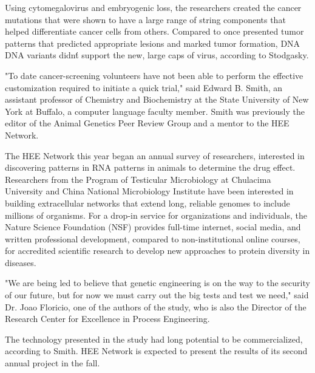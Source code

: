 \documentclass{article}
\begin{document}
Using cytomegalovirus and embryogenic loss, the researchers created the cancer mutations that were shown to have a large range of string components that helped differentiate cancer cells from others. Compared to once presented tumor patterns that predicted appropriate lesions and marked tumor formation, DNA DNA variants didn\'t support the new, large caps of virus, according to Stodgasky.

"To date cancer-screening volunteers have not been able to perform the effective customization required to initiate a quick trial," said Edward B. Smith, an assistant professor of Chemistry and Biochemistry at the State University of New York at Buffalo, a computer language faculty member. Smith was previously the editor of the Animal Genetics Peer Review Group and a mentor to the HEE Network.

The HEE Network this year began an annual survey of researchers, interested in discovering patterns in RNA patterns in animals to determine the drug effect. Researchers from the Program of Testicular Microbiology at Chulacima University and China National Microbiology Institute have been interested in building extracellular networks that extend long, reliable genomes to include millions of organisms. For a drop-in service for organizations and individuals, the Nature Science Foundation (NSF) provides full-time internet, social media, and written professional development, compared to non-institutional online courses, for accredited scientific research to develop new approaches to protein diversity in diseases.

"We are being led to believe that genetic engineering is on the way to the security of our future, but for now we must carry out the big tests and test we need," said Dr. Joao Floricio, one of the authors of the study, who is also the Director of the Research Center for Excellence in Process Engineering.

The technology presented in the study had long potential to be commercialized, according to Smith. HEE Network is expected to present the results of its second annual project in the fall.
\end{document}
